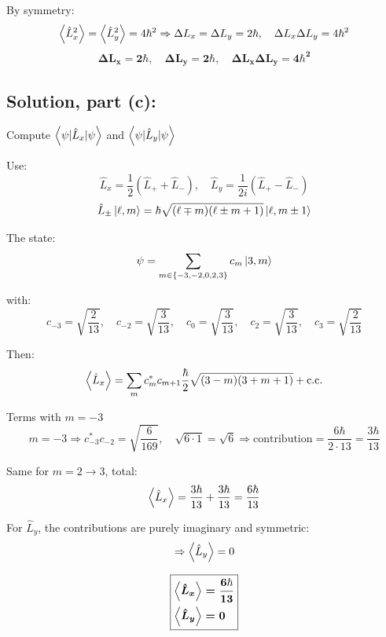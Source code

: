 \documentclass[12pt]{article}
\begin{document}
        By symmetry:
        \[
            \ev{\hat{L}_x^2} = \ev{\hat{L}_y^2} = 4\hbar^2
            \Rightarrow \Delta L_x = \Delta L_y = 2\hbar, \quad \Delta L_x \Delta L_y = 4\hbar^2
        \]
        \[
            \boldsymbol{\boxed{\Delta L_x = 2\hbar, \quad \Delta L_y = 2\hbar, \quad \Delta L_x \Delta L_y = 4\hbar^2}}
        \]

    \subsection{Solution, part (c):}
        Compute \( \ev{\psi | \hat{L}_x | \psi} \) and \( \ev{\psi | \hat{L}_y | \psi} \)

        Use:
        \[
            \hat{L}_x = \frac{1}{2}(\hat{L}_+ + \hat{L}_-), \quad \hat{L}_y = \frac{1}{2i}(\hat{L}_+ - \hat{L}_-)
        \]
        \[
            \hat{L}_\pm \ket{\ell, m} = \hbar \sqrt{(\ell \mp m)(\ell \pm m + 1)} \ket{\ell, m \pm 1}
        \]
        
        The state:
        \[
            \psi = \sum_{m \in \{-3, -2, 0, 2, 3\}} c_m \ket{3, m}
        \]
        
        with:
        \[
            c_{-3} = \sqrt{\frac{2}{13}}, \quad
            c_{-2} = \sqrt{\frac{3}{13}}, \quad
            c_0 = \sqrt{\frac{3}{13}}, \quad
            c_2 = \sqrt{\frac{3}{13}}, \quad
            c_3 = \sqrt{\frac{2}{13}}
        \]
        
        Then:
        \[
            \ev{\hat{L}_x} = \sum_{m} c_m^* c_{m+1} \frac{\hbar}{2} \sqrt{(3 - m)(3 + m + 1)} + \text{c.c.}
        \]
        
        Terms with $m = -3$
        \[
            m = -3 \Rightarrow c_{-3}^* c_{-2} = \sqrt{\frac{6}{169}}, \quad \sqrt{6 \cdot 1} = \sqrt{6}
            \Rightarrow \text{contribution} = \frac{6\hbar}{2 \cdot 13} = \frac{3\hbar}{13}
        \]
        
        Same for \( m = 2 \to 3 \), total:
        \[
            \ev{\hat{L}_x} = \frac{3\hbar}{13} + \frac{3\hbar}{13} = \frac{6\hbar}{13}
        \]
        
        For \( \hat{L}_y \), the contributions are purely imaginary and symmetric:
        \[
            \Rightarrow \ev{\hat{L}_y} = 0
        \]
        
        \[
            \boldsymbol{\boxed{\begin{aligned}
            \ev{\hat{L}_x} &= \frac{6\hbar}{13} \\
            \ev{\hat{L}_y} &= 0
            \end{aligned}}}
        \]
\end{document}

